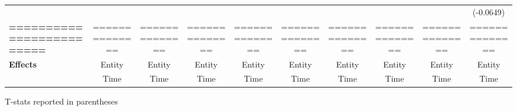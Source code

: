 \begin{center}
\begin{tabular}{lccccccccc}
\textbf{ }                         &                &                  &                  &                  &                  &                  &                  &                  &    (-0.0649)      \\
\textbf{=========================} & ============== &  ==============  &  ==============  &  ==============  &  ==============  &  ==============  &  ==============  &  ==============  &  ==============   \\
\textbf{Effects}                   &     Entity     &      Entity      &      Entity      &      Entity      &      Entity      &      Entity      &      Entity      &      Entity      &      Entity       \\
\textbf{}                          &      Time      &       Time       &       Time       &       Time       &       Time       &       Time       &       Time       &       Time       &       Time        \\
\bottomrule
\end{tabular}
\end{center}

T-stats reported in parentheses